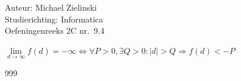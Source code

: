 \documentclass[a4paper]{article}
\begin{document}
  
\noindent \large Auteur: Michael Zielinski\\ 
\noindent \large Studierichting: Informatica\\
\noindent \large Oefeningenreeks 2C nr.\ 9.4\\ 

\medskip

\normalsize

$\lim\limits_{d \rightarrow \infty} f(d) = -\infty \Leftrightarrow \forall P > 0, \exists Q > 0 : |d| > Q \Rightarrow f(d) < -P$\\

\begin{thebibliography}{999}
\end{thebibliography}
\end{document}
